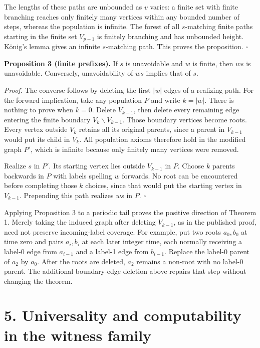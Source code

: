 \documentclass[
  11pt,
]{article}
\begin{document}
The lengths of these paths are unbounded as \(v\) varies: a finite set
with finite branching reaches only finitely many vertices within any
bounded number of steps, whereas the population is infinite. The forest
of all \(s\)-matching finite paths starting in the finite set
\(V_{p-1}\) is finitely branching and has unbounded height. König's
lemma gives an infinite \(s\)-matching path. This proves the
proposition.
\leavevmode\unskip{}\hbox{}\nobreak\hfill\quad\hbox{$\square$}

\textbf{Proposition 3 (finite prefixes).} If \(s\) is unavoidable and
\(w\) is finite, then \(ws\) is unavoidable. Conversely, unavoidability
of \(ws\) implies that of \(s\).

\emph{Proof.} The converse follows by deleting the first \(|w|\) edges
of a realizing path. For the forward implication, take any population
\(P\) and write \(k=|w|\). There is nothing to prove when \(k=0\).
Delete \(V_{k-1}\), then delete every remaining edge entering the finite
boundary \(V_k\backslash V_{k-1}\). Those boundary vertices become
roots. Every vertex outside \(V_k\) retains all its original parents,
since a parent in \(V_{k-1}\) would put its child in \(V_k\). All
population axioms therefore hold in the modified graph \(P'\), which is
infinite because only finitely many vertices were removed.

Realize \(s\) in \(P'\). Its starting vertex lies outside \(V_{k-1}\) in
\(P\). Choose \(k\) parents backwards in \(P\) with labels spelling
\(w\) forwards. No root can be encountered before completing those \(k\)
choices, since that would put the starting vertex in \(V_{k-1}\).
Prepending this path realizes \(ws\) in \(P\).
\leavevmode\unskip{}\hbox{}\nobreak\hfill\quad\hbox{$\square$}

Applying Proposition 3 to a periodic tail proves the positive direction
of Theorem 1. Merely taking the induced graph after deleting
\(V_{k-1}\), as in the published proof, need not preserve incoming-label
coverage. For example, put two roots \(a_0,b_0\) at time zero and pairs
\(a_i,b_i\) at each later integer time, each normally receiving a
label-0 edge from \(a_{i-1}\) and a label-1 edge from \(b_{i-1}\).
Replace the label-0 parent of \(a_2\) by \(a_0\). After the roots are
deleted, \(a_2\) remains a non-root with no label-0 parent. The
additional boundary-edge deletion above repairs that step without
changing the theorem.

\section{5. Universality and computability in the witness
family}\label{universality-and-computability-in-the-witness-family}
\end{document}
